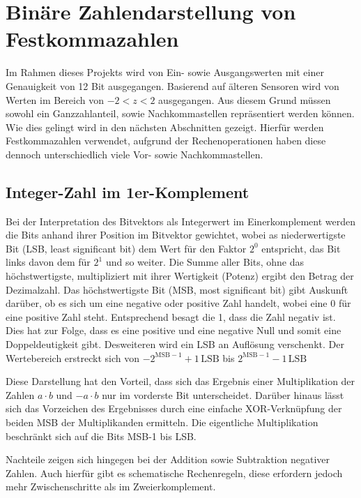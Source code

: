 \section{Binäre Zahlendarstellung von Festkommazahlen}

Im Rahmen dieses Projekts wird von Ein- sowie Ausgangswerten mit einer Genauigkeit von 12 Bit ausgegangen.
Basierend auf älteren Sensoren wird von Werten im Bereich von $-2 < z < 2$ ausgegangen.
Aus diesem Grund müssen sowohl ein Ganzzahlanteil, sowie Nachkommastellen repräsentiert werden können. Wie dies gelingt wird in den nächsten Abschnitten gezeigt.
Hierfür werden Festkommazahlen verwendet, aufgrund der Rechenoperationen haben diese dennoch unterschiedlich viele Vor- sowie Nachkommastellen.


\subsection{Integer-Zahl im 1er-Komplement}
Bei der Interpretation des Bitvektors als Integerwert im Einerkomplement werden die Bits anhand ihrer Position im Bitvektor gewichtet, wobei as niederwertigste Bit 
(LSB, least significant bit) dem Wert für den Faktor $2^0$ entspricht, das Bit links davon dem für $2^1$ und so weiter. Die Summe aller Bits, ohne das höchstwertigste, 
multipliziert mit ihrer Wertigkeit (Potenz) ergibt den Betrag der Dezimalzahl. Das höchstwertigste Bit (MSB, most significant bit) gibt Auskunft darüber, ob es sich 
um eine negative oder positive Zahl handelt, wobei eine 0 für eine positive Zahl steht. Entsprechend besagt die 1, dass die Zahl negativ ist.
Dies hat zur Folge, dass es eine positive und eine negative Null und somit eine Doppeldeutigkeit gibt. Desweiteren wird
ein LSB an Auflösung verschenkt. Der Wertebereich erstreckt sich von $-2^{\mathrm{MSB}-1}+1\,\mathrm{LSB}$ bis $2^{\mathrm{MSB}-1}-1\,\mathrm{LSB}$

Diese Darstellung hat den Vorteil, dass sich das Ergebnis einer Multiplikation der Zahlen $a \cdot b$ und $-a \cdot b$ nur im vorderste Bit unterscheidet. Darüber hinaus
lässt sich das Vorzeichen des Ergebnisses durch eine einfache XOR-Verknüpfung der beiden MSB der Multiplikanden ermitteln. 
Die eigentliche Multiplikation beschränkt sich auf die Bits MSB-1 bis LSB.

Nachteile zeigen sich hingegen bei der Addition sowie Subtraktion negativer Zahlen. Auch hierfür gibt es schematische Rechenregeln, diese erfordern jedoch mehr 
Zwischenschritte als im Zweierkomplement. 


